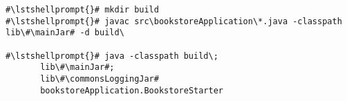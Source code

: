 \begin{lstlisting}[caption=Commands to compile and run the instrumented Bookstore under Windows,label=lst:bookstoreStarterWin]
#\lstshellprompt{}# mkdir build
#\lstshellprompt{}# javac src\bookstoreApplication\*.java -classpath lib\#\mainJar# -d build\

#\lstshellprompt{}# java -classpath build\;
       lib\#\mainJar#;
       lib\#\commonsLoggingJar#
       bookstoreApplication.BookstoreStarter 
\end{lstlisting}
